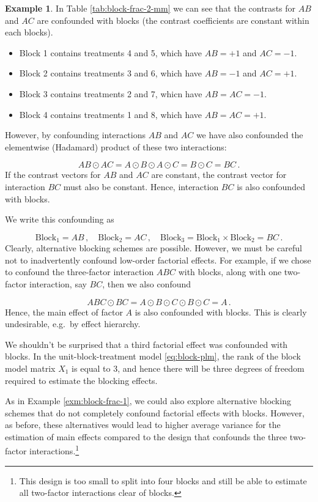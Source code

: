 \documentclass[
]{book}
\theoremstyle{definition}
\theoremstyle{definition}
\newtheorem{example}{Example}[chapter]
\theoremstyle{definition}
\theoremstyle{definition}
\theoremstyle{remark}
\begin{document}
\begin{example}
In Table \ref{tab:block-frac-2-mm} we can see that the contrasts for \(AB\) and \(AC\) are confounded with blocks (the contrast coefficients are constant within each blocks).

\begin{itemize}
\item
  Block 1 contains treatments 4 and 5, which have \(AB = +1\) and \(AC = -1\).
\item
  Block 2 contains treatments 3 and 6, which have \(AB = -1\) and \(AC = +1\).
\item
  Block 3 contains treatments 2 and 7, whicn have \(AB = AC = -1\).
\item
  Block 4 contains treatments 1 and 8, which have \(AB = AC = +1\).
\end{itemize}

However, by confounding interactions \(AB\) and \(AC\) we have also confounded the elementwise (Hadamard) product of these two interactions:

\[
AB \odot AC = A \odot B \odot A \odot C = B \odot C = BC\,.
\]
If the contrast vectors for \(AB\) and \(AC\) are constant, the contrast vector for interaction \(BC\) must also be constant. Hence, interaction \(BC\) is also confounded with blocks.

We write this confounding as

\[
\mathrm{Block}_1 = AB\,,\quad \mathrm{Block}_2 = AC\,,\quad \mathrm{Block}_3 = \mathrm{Block}_1\times\mathrm{Block}_2 = BC\,.
\]
Clearly, alternative blocking schemes are possible. However, we must be careful not to inadvertently confound low-order factorial effects. For example, if we chose to confound the three-factor interaction \(ABC\) with blocks, along with one two-factor interaction, say \(BC\), then we also confound

\[
ABC \odot BC = A \odot B \odot C \odot B \odot C = A\,.
\]
Hence, the main effect of factor \(A\) is also confounded with blocks. This is clearly undesirable, e.g.~by effect hierarchy.

We shouldn't be surprised that a third factorial effect was confounded with blocks. In the unit-block-treatment model \eqref{eq:block-plm}, the rank of the block model matrix \(X_1\) is equal to 3, and hence there will be three degrees of freedom required to estimate the blocking effects.

As in Example \ref{exm:block-frac-1}, we could also explore alternative blocking schemes that do not completely confound factorial effects with blocks. However, as before, these alternatives would lead to higher average variance for the estimation of main effects compared to the design that confounds the three two-factor interactions.\footnote{This design is too small to split into four blocks and still be able to estimate all two-factor interactions clear of blocks.}
\end{example}
\end{document}
